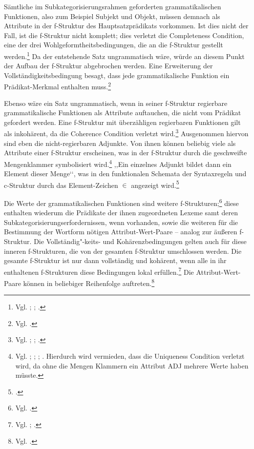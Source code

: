 \documentclass[12pt,a4paper]{article}
\begin{document}
Sämtliche im Subkategorisierungsrahmen geforderten grammatikalischen Funktionen, also zum Beispiel Subjekt und Objekt, müssen demnach als Attribute in der f-Struktur des Hauptsatzprädikats vorkommen. Ist dies nicht der Fall, ist die f-Struktur nicht komplett; dies verletzt die Completeness Condition, eine der drei Wohlgeformtheitsbedingungen, die an die f-Struktur gestellt werden.\footnote{Vgl. \cite[58-9]{Falk}; \cite[28]{Rohrer}; \cite[19-20]{Skript}.} Da der entstehende Satz ungrammatisch wäre, würde an diesem Punkt der Aufbau der f-Struktur abgebrochen werden. Eine Erweiterung der Vollständigkeitsbedingung besagt, dass jede grammatikalische Funktion ein Prädikat-Merkmal enthalten muss.\footnote{Vgl. \cite[61]{Falk}.}

Ebenso wäre ein Satz ungrammatisch, wenn in seiner f-Struktur regierbare grammatikalische Funktionen als Attribute auftauchen, die nicht vom Prädikat gefordert werden. Eine f-Struktur mit überzähligen regierbaren Funktionen gilt als inkohärent, da die Coherence Condition verletzt wird.\footnote{Vgl. \cite[59-62]{Falk}; \cite[29; 39]{Rohrer}; \cite[20]{Skript}.} Ausgenommen hiervon sind eben die nicht-regierbaren Adjunkte. Von ihnen können beliebig viele als Attribute einer f-Struktur erscheinen, was in der f-Struktur durch die geschweifte Mengenklammer symbolisiert wird.\footnote{Vgl. \cite[61; 72]{Falk}; \cite[12]{Dal}; \cite[28]{Rohrer}; \cite[38-40]{Skript}. Hierdurch wird vermieden, dass die Uniqueness Condition verletzt wird, da ohne die Mengen Klammern ein Attribut ADJ mehrere Werte haben müsste.} ,,Ein einzelnes Adjunkt bildet dann ein Element dieser Menge‘‘, was in den funktionalen Schemata der Syntaxregeln und c-Struktur durch das Element-Zeichen $\in$ angezeigt wird.\footnote{ \cite[39]{Skript}.}

Die Werte der grammatikalischen Funktionen sind weitere f-Strukturen;\footnote{Vgl. \cite[35]{Rohrer}.} diese enthalten wiederum die Prädikate der ihnen zugeordneten Lexeme samt deren Subkategorisierungserfordernissen, wenn vorhanden, sowie die weiteren für die Bestimmung der Wortform nötigen Attribut-Wert-Paare -- analog zur äußeren f-Struktur. Die Vollständig"-keits- und Kohärenzbedingungen gelten auch für diese inneren f-Strukturen, die von der gesamten f-Struktur umschlossen werden. Die gesamte f-Struktur ist nur dann vollständig und kohärent, wenn alle in ihr enthaltenen f-Strukturen diese Bedingungen lokal erfüllen.\footnote{Vgl. \cite[60]{Falk}; \cite[19-21]{Skript}.}
Die Attribut-Wert-Paare können in beliebiger Reihenfolge auftreten.\footnote{Vgl. \cite[35]{Rohrer}.}
\end{document}
